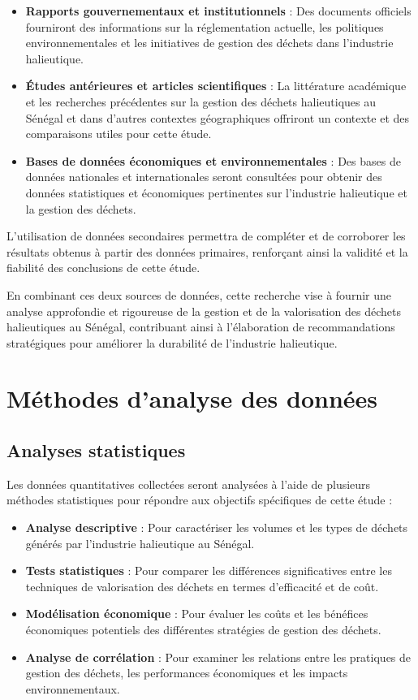 \documentclass[12pt,a4paper]{report}
\begin{document}
\begin{itemize}
    \item \textbf{Rapports gouvernementaux et institutionnels} : Des documents officiels fourniront des informations sur la réglementation actuelle, les politiques environnementales et les initiatives de gestion des déchets dans l'industrie halieutique.
    \item \textbf{Études antérieures et articles scientifiques} : La littérature académique et les recherches précédentes sur la gestion des déchets halieutiques au Sénégal et dans d'autres contextes géographiques offriront un contexte et des comparaisons utiles pour cette étude.
    \item \textbf{Bases de données économiques et environnementales} : Des bases de données nationales et internationales seront consultées pour obtenir des données statistiques et économiques pertinentes sur l'industrie halieutique et la gestion des déchets.
\end{itemize}

L'utilisation de données secondaires permettra de compléter et de corroborer les résultats obtenus à partir des données primaires, renforçant ainsi la validité et la fiabilité des conclusions de cette étude.

En combinant ces deux sources de données, cette recherche vise à fournir une analyse approfondie et rigoureuse de la gestion et de la valorisation des déchets halieutiques au Sénégal, contribuant ainsi à l'élaboration de recommandations stratégiques pour améliorer la durabilité de l'industrie halieutique.


\section{Méthodes d'analyse des données}

\subsection{Analyses statistiques}

Les données quantitatives collectées seront analysées à l'aide de plusieurs méthodes statistiques pour répondre aux objectifs spécifiques de cette étude :

\begin{itemize}
    \item \textbf{Analyse descriptive} : Pour caractériser les volumes et les types de déchets générés par l'industrie halieutique au Sénégal.
    \item \textbf{Tests statistiques} : Pour comparer les différences significatives entre les techniques de valorisation des déchets en termes d'efficacité et de coût.
    \item \textbf{Modélisation économique} : Pour évaluer les coûts et les bénéfices économiques potentiels des différentes stratégies de gestion des déchets.
    \item \textbf{Analyse de corrélation} : Pour examiner les relations entre les pratiques de gestion des déchets, les performances économiques et les impacts environnementaux.
\end{itemize}
\end{document}
